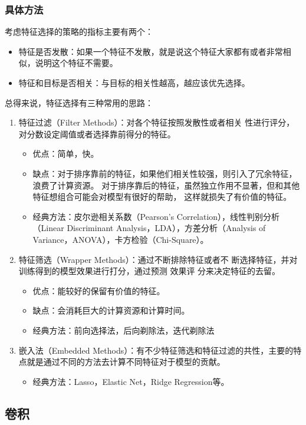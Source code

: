 \documentclass[UTF8]{ctexart}
\begin{document}
\subsubsection{具体方法}
考虑特征选择的策略的指标主要有两个：
\begin{itemize}
	\item 特征是否发散：如果一个特征不发散，就是说这个特征大家都有或者非常相似，说明这个特征不需要。
	\item 特征和目标是否相关：与目标的相关性越高，越应该优先选择。
\end{itemize}
总得来说，特征选择有三种常用的思路：
\begin{enumerate}
	\item 特征过滤（Filter Methods）：对各个特征按照发散性或者相关 性进行评分，对分数设定阈值或者选择靠前得分的特征。\begin{itemize}
		\item 优点：简单，快。
		\item 缺点：对于排序靠前的特征，如果他们相关性较强，则引入了冗余特征，浪费了计算资源。 对于排序靠后的特征，虽然独立作用不显著，但和其他特征想组合可能会对模型有很好的帮助， 这样就损失了有价值的特征。
		\item 经典方法：皮尔逊相关系数（Pearson's Correlation），线性判别分析（Linear Discriminant Analysis，LDA），方差分析（Analysis of Variance，ANOVA），卡方检验（Chi-Square）。
	\end{itemize}
	\item 特征筛选（Wrapper Methods）：通过不断排除特征或者不 断选择特征，并对训练得到的模型效果进行打分，通过预测 效果评 分来决定特征的去留。 \begin{itemize}
		\item 优点：能较好的保留有价值的特征。
		\item 缺点：会消耗巨大的计算资源和计算时间。
		\item 经典方法：前向选择法，后向剃除法，迭代剃除法
	\end{itemize}
	\item 嵌入法（Embedded Methods）：有不少特征筛选和特征过滤的共性，主要的特点就是通过不同的方法去计算不同特征对于模型的贡献。\begin{itemize}
		\item 经典方法：Lasso，Elastic Net，Ridge Regression等。
	\end{itemize}
\end{enumerate}

\subsection{卷积}
\end{document}
